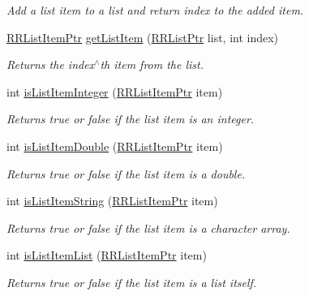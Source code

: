 \begin{DoxyCompactItemize}
\begin{DoxyCompactList}\small\item\em Add a list item to a list and return index to the added item. \end{DoxyCompactList}\item 
\hyperlink{rrc__types_8h_a79938364b69256c42480bb3a29ebf73e}{R\+R\+List\+Item\+Ptr} \hyperlink{group__list_gaf1f33d11323825ab94f9318ba8b55de2}{get\+List\+Item} (\hyperlink{rrc__types_8h_a32a8a60ac06858ff3a791672bd2bec73}{R\+R\+List\+Ptr} list, int index)
\begin{DoxyCompactList}\small\item\em Returns the index$^\wedge$th item from the list. \end{DoxyCompactList}\item 
int \hyperlink{group__list_ga1da200f65e7e7764c3ecceae2fc22545}{is\+List\+Item\+Integer} (\hyperlink{rrc__types_8h_a79938364b69256c42480bb3a29ebf73e}{R\+R\+List\+Item\+Ptr} item)
\begin{DoxyCompactList}\small\item\em Returns true or false if the list item is an integer. \end{DoxyCompactList}\item 
int \hyperlink{group__list_ga96483520ffdc5aaad30a893e24d4d48c}{is\+List\+Item\+Double} (\hyperlink{rrc__types_8h_a79938364b69256c42480bb3a29ebf73e}{R\+R\+List\+Item\+Ptr} item)
\begin{DoxyCompactList}\small\item\em Returns true or false if the list item is a double. \end{DoxyCompactList}\item 
int \hyperlink{group__list_gaae6a64b6972f2c8f9df695ebc3eed3f8}{is\+List\+Item\+String} (\hyperlink{rrc__types_8h_a79938364b69256c42480bb3a29ebf73e}{R\+R\+List\+Item\+Ptr} item)
\begin{DoxyCompactList}\small\item\em Returns true or false if the list item is a character array. \end{DoxyCompactList}\item 
int \hyperlink{group__list_ga8765e5450d3a82d8875d8615080437c9}{is\+List\+Item\+List} (\hyperlink{rrc__types_8h_a79938364b69256c42480bb3a29ebf73e}{R\+R\+List\+Item\+Ptr} item)
\begin{DoxyCompactList}\small\item\em Returns true or false if the list item is a list itself. \end{DoxyCompactList}\item 

\end{DoxyCompactItemize}
